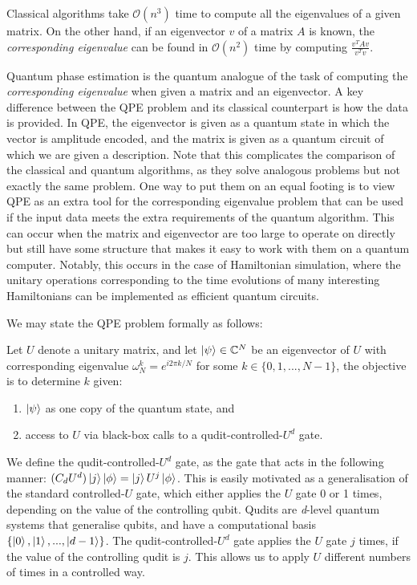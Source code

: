 \documentclass[prb,preprint]{revtex4}
\begin{document}
	Classical algorithms take $\mathcal{O}(n^3)$ time to compute \cite{trefethen2022numerical} all the eigenvalues of a given matrix. On the other hand, if an eigenvector $v$ of a matrix $A$ is known, the \textit{corresponding eigenvalue} can be found in $\mathcal{O}(n^2)$ time by computing $\frac{v^T A v}{v^T v}$.  
	
	Quantum phase estimation is the quantum analogue of the task of computing the \textit{corresponding eigenvalue} when given a matrix and an eigenvector. A key difference between the QPE problem and its classical counterpart is how the data is provided. In QPE, the eigenvector is given as a quantum state in which the vector is amplitude encoded, and the matrix is given as a quantum circuit of which we are given a description. Note that this complicates the comparison of the classical and quantum algorithms, as they solve analogous problems but not exactly the same problem. One way to put them on an equal footing is to view QPE as an extra tool for the corresponding eigenvalue problem that can be used if the input data meets the extra requirements of the quantum algorithm. This can occur when the matrix and eigenvector are too large to operate on directly but still have some structure that makes it easy to work with them on a quantum computer. Notably, this occurs in the case of Hamiltonian simulation, where the unitary operations corresponding to the time evolutions of many interesting Hamiltonians can be implemented as efficient quantum circuits\cite{aspuru2005simulated}.
	
	 We may state the QPE problem formally as follows: 
	
	\begin{problem*}
		Let $U$ denote a unitary matrix, and let $\ket{\psi} \in \mathbb{C}^N$ be an eigenvector of $U$ with corresponding eigenvalue $\omega_N^k = e^{i 2 \pi k/N}$ for some $k\in \{0,1,...,N-1\}$, the objective is to determine $k$ given:
		\begin{enumerate}
			\item $\ket{\psi}$ as one copy of the quantum state, and
			\item access to $U$ via black-box calls to a qudit-controlled-$U^d$ gate.
		\end{enumerate} 
	\end{problem*}

	We define the qudit-controlled-$U^d$ gate, as the gate that acts in the following manner:
	$(C_dU^d) \ket{j}\ket{\phi} = \ket{j}U^j\ket{\phi}$. This is easily motivated as a generalisation of the standard controlled-$U$ gate, which either applies the $U$ gate 0 or 1 times, depending on the value of the controlling qubit. Qudits are \textit{d}-level quantum systems that generalise qubits, and have a computational basis $\{\ket{0},\ket{1},...,\ket{d-1}\}$. The qudit-controlled-$U^d$ gate applies the $U$ gate $j$ times, if the value of the controlling qudit is $j$. This allows us to apply $U$ different numbers of times in a controlled way. 
	
\end{document}
